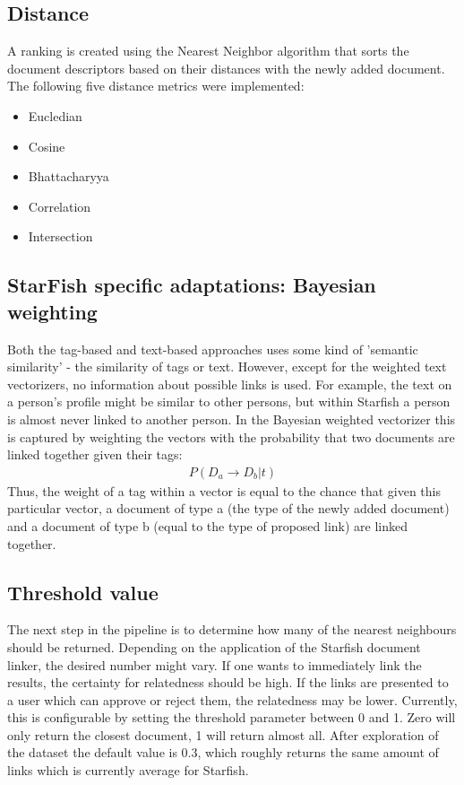 \subsection{Distance}
A ranking is created using the Nearest Neighbor algorithm that sorts the document descriptors based on their distances with the newly added document. The following five distance metrics were implemented: 

\begin{itemize}
\item Eucledian
\item Cosine
\item Bhattacharyya
\item Correlation
\item Intersection
\end{itemize}

\subsection{StarFish specific adaptations: Bayesian weighting}
Both the tag-based and text-based approaches uses some kind of 'semantic similarity' - the similarity of tags or text. However, except for the weighted text vectorizers, no information about possible links is used. For example, the text on a person's profile might be similar to other persons, but within Starfish a person is almost never linked to another person. In the Bayesian weighted vectorizer this is captured by weighting the vectors with the probability that two documents are linked together given their tags:
\begin{align}
\nonumber P(D_a \rightarrow D_b | t)
\end{align}
Thus, the weight of a tag within a vector is equal to the chance that given this particular vector, a document of type a (the type of the newly added document) and a document of type b (equal to the type of proposed link) are linked together.

\subsection{Threshold value}
The next step in the pipeline is to determine how many of the nearest neighbours should be returned. Depending on the application of the Starfish document linker, the desired number might vary. If one wants to immediately link the results, the certainty for relatedness should be high. If the links are presented to a user which can approve or reject them, the relatedness may be lower. Currently, this is configurable by setting the threshold parameter between 0 and 1. Zero will only return the closest document, 1 will return almost all. After exploration of the dataset the default value is 0.3, which roughly returns the same amount of links which is currently average for Starfish.
